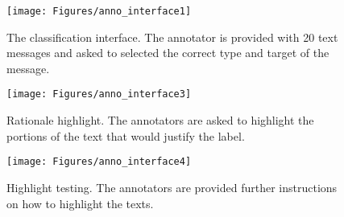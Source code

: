 \documentclass[letterpaper]{article} \usepackage{aaai21}  \usepackage{times}  \usepackage{helvet} \usepackage{courier}  \usepackage[hyphens]{url}  \usepackage{graphicx} \urlstyle{rm} \def\UrlFont{\rm}  \usepackage{natbib}  \usepackage{caption}
\begin{document}
\begin{figure}[!tbh]
 \texttt{[image: Figures/anno\_interface1]}
 \caption{The classification interface. The annotator is provided with 20 text messages and asked to selected the correct type and target of the message.} 
 \label{fig:anno1}
\end{figure}

\begin{figure}[!tbh]
 \texttt{[image: Figures/anno\_interface3]}
 \caption{Rationale highlight. The annotators are asked to highlight the portions of the text that would justify the label.} 
 \label{fig:anno3}
\end{figure}


\begin{figure}[!tbh]
 \texttt{[image: Figures/anno\_interface4]}
 \caption{Highlight testing. The annotators are provided further instructions on how to highlight the texts.} 
 \label{fig:anno4}
\end{figure}
\end{document}
